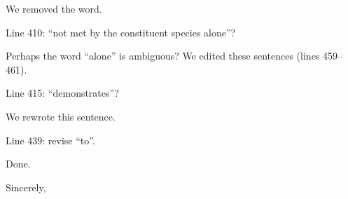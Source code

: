 \documentclass[letterpaper, 12pt]{letter}
\begin{document}
\begin{letter}{}
We removed the word.

\begin{quoting}
  Line 410: “not met by the constituent species alone”?
\end{quoting}

Perhaps the word ``alone'' is ambiguous? We edited these sentences (lines 459--461).

\begin{quoting}
  Line 415: “demonstrates”?
\end{quoting}

We rewrote this sentence.

\begin{quoting}
  Line 439: revise “to”.
\end{quoting}

Done.

\closing{Sincerely,}

\end{letter}
\end{document}

